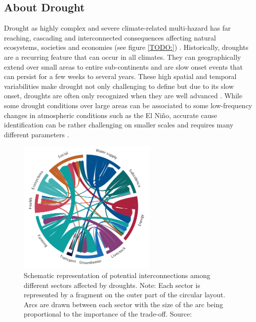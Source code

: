 

\subsection{About Drought}\label{subsec:about_drought}

Drought as highly complex and severe climate-related multi-hazard has far reaching, cascading and interconnected consequences affecting natural ecosystems, societies and economies (see figure \ref{TODO:}) \autocite{vereintenationenSpecialReportDrought2021}. Historically, droughts are a recurring feature that can occur in all climates. They can geographically extend over small areas to entire sub-continents and are slow onset events that can persist for a few weeks to several years. These high spatial and temporal variabilities make drought not only challenging to define but due to its slow onset, droughts are often only recognized when they are well advanced \autocite{idmpDroughtWaterScarcity2022,vereintenationenSpecialReportDrought2021}. While some drought conditions over large areas can be associated to some low-frequency changes in atmospheric conditions such as the El Niño, accurate cause identification can be rather challenging on smaller scales and requires many different parameters \autocite{botaiAnalysisDroughtProgression2019, vereintenationenSpecialReportDrought2021}.

\begin{figure}[!ht]
    \centering
    \includegraphics[width=0.6\textwidth]{figures/2023_MA_th_drought_interconnections.pdf}
    \decoRule
    \caption[Interconnectedness of Drought Impacts]{Schematic representation of potential interconnections among different sectors affected by droughts. {\footnotesize Note: Each sector is represented by a fragment on the outer part of the circular layout. Arcs are drawn between each sector with the size of the arc being proportional to the importance of the trade-off}. Source: \autocite[47]{vereintenationenSpecialReportDrought2021}}
    \label{fig:th_drought}
\end{figure}

